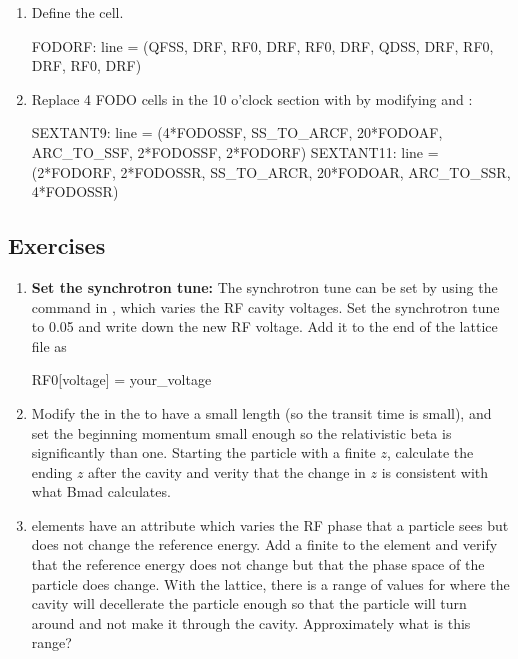 \documentclass{hitec}     %
\begin{document}
{\begin{enumerate}[leftmargin=*]
    \item Define the  cell.
    \begin{code}
FODORF: line = (QFSS, DRF, RF0, DRF, RF0, DRF, QDSS, DRF, RF0, DRF, RF0, DRF)
    \end{code}
    
    \item Replace 4 FODO cells in the 10 o'clock section with  by modifying  and :
    \begin{code}
SEXTANT9:  line = (4*FODOSSF, SS_TO_ARCF, 20*FODOAF, 
                              ARC_TO_SSF, 2*FODOSSF, 2*FODORF)
SEXTANT11: line = (2*FODORF, 2*FODOSSR, SS_TO_ARCR, 
                        20*FODOAR, ARC_TO_SSR, 4*FODOSSR)
    \end{code}
\end{enumerate}

\subsection{Exercises}

\begin{enumerate}[leftmargin=*]
%
\item {\bf Set the synchrotron tune:} The synchrotron tune can be set by using the  command in \tao, which varies the RF cavity voltages. Set the synchrotron tune to 0.05 and write down the new RF voltage. Add it to the end of the lattice file as
\begin{code}
RF0[voltage] = your_voltage
\end{code}
%
\item 
Modify the  in the  to have a small length (so the transit time is
small), and set the beginning momentum small enough so the relativistic beta is significantly than
one. Starting the particle with a finite $z$, calculate the ending $z$ after the cavity and verity
that the change in $z$ is consistent with what Bmad calculates.
%
\item
{} elements have an attribute  which varies the RF phase that a particle sees
but does not change the reference energy. Add a finite  to the  element and
verify that the reference energy does not change but that the phase space  of the particle
does change. 
 With the  lattice, there is a range of values for  where the
cavity will decellerate the particle enough so that the particle will turn around and not make
it through the cavity. Approximately what is this range?
%
\end{enumerate}

}
\end{document}
